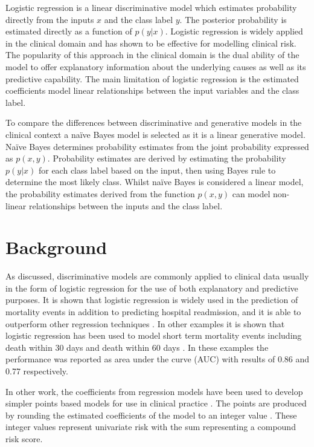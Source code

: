\documentclass[a4paper,UKenglish]{oasics-v2016}
\begin{document}
Logistic regression is a linear discriminative model which estimates probability directly from the inputs $x$ and the class label $y$. The posterior probability is estimated directly as a function of $p(y|x)$. Logistic regression is widely applied in the clinical domain and has shown to be effective for modelling clinical risk. The popularity of this approach in the clinical domain is the dual ability of the model to offer explanatory information about the underlying causes as well as its predictive capability. The main limitation of logistic regression is the estimated coefficients model linear relationships between the input variables and the class label.

To compare the differences between discriminative and generative models in the clinical context a naïve Bayes model is selected as it is a linear generative model. Naïve Bayes determines probability estimates from the joint probability expressed as $p(x,y)$. Probability estimates are derived by estimating the probability $p(y|x)$ for each class label based on the input, then using Bayes rule to determine the most likely class. Whilst naïve Bayes is considered a linear model, the probability estimates derived from the function $p(x,y)$ can model non-linear relationships between the inputs and the class label.


\section{Background}
As discussed, discriminative models are commonly applied to clinical data usually in the form of logistic regression for the use of both explanatory and predictive purposes. It is shown that logistic regression is widely used in the prediction of mortality events in addition to predicting hospital readmission, and it is able to outperform other regression techniques \cite{Vries2013}. In other examples it is shown that logistic regression has been used to model short term mortality events including death within 30 days \cite{Amarasingham2010} and death within 60 days \cite{Felker2004}. In these examples the performance was reported as area under the curve (AUC) with results of 0.86 and 0.77 respectively.

In other work, the coefficients from regression models have been used to develop simpler points based models for use in clinical practice \cite{Wilson1998}\cite{Pocock2013}. The points are produced by rounding the estimated coefficients of the model to an integer value \cite{Pocock2013}\cite{Levy2006}. These integer values represent univariate risk with the sum representing a compound risk score.
\end{document}
